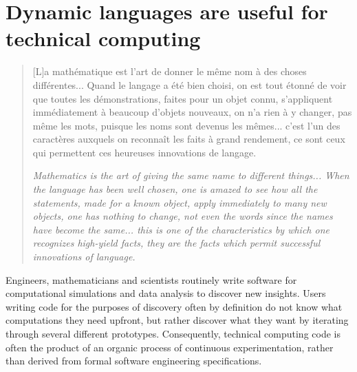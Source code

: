 \documentclass[pldi]{sigplanconf-pldi15}
\begin{document}

\tableofcontents %

\section{Dynamic languages are useful for technical computing}

\begin{quote}
	[L]a math\'ematique est l'art de donner le m\^eme nom \`a des choses
	diff\'erentes... Quand le langage a \'et\'e bien choisi, on est tout \'etonn\'e
	de voir que toutes les d\'emonstrations, faites pour un objet connu,
	s'appliqu\-ent imm\'ediatement \`a beaucoup d'objets nouveaux, on n'a rien \`a
	y changer, pas m\^eme les mots, puisque les noms sont devenus les
	m\^emes... c'est l'un des caract\`eres auxquels on reconna\^it les faits \`a
	grand rendement, ce sont ceux qui permettent ces heureuses
	innovations de langage. \cite{Poincare1908}
	
	\textit{Mathematics is the art of giving the same name to different
	things... When the language has been well chosen, one is amazed to see
	how all the statements, made for a known object, apply immediately
	to many new objects, one has nothing to change, not even the words
	since the names have become the same... this is one of the
	characteristics by which one recognizes high-yield facts, they are the
	facts which permit successful innovations of language.}
\end{quote}

Engineers, mathematicians and scientists routinely write software for
computational simulations and data analysis to discover new insights.
Users writing code for the purposes of discovery often by definition do not
know what computations they need upfront, but rather discover what they want by
iterating through several different prototypes. Consequently, technical
computing code is often the product of an organic process of continuous
experimentation, rather than derived from formal software engineering
specifications.
\end{document}
